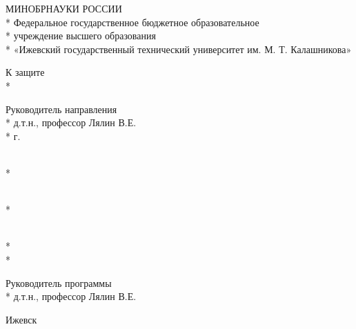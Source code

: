 \begin{titlepage}

\thispagestyle{empty}

\begin{center}
\large
МИНОБРНАУКИ РОССИИ\\*
Федеральное государственное бюджетное образовательное\\*
учреждение высшего образования\\*
«Ижевский государственный технический университет им. М. Т. Калашникова»
\vspace{1cm}
\end{center}

\hfill
\begin{minipage}{0.3\textwidth}
К защите\\*

Руководитель направления\\*
д.т.н., профессор Лялин В.Е.\\*
\text{\mydate} \text{\mymonth} \text{\myyear} г.
\end{minipage}

\vspace{6em}

\begin{center}
\textbf{\myfullname}\\*
\vspace{1em}
\titletext
\end{center}

\begin{center}
\myspeciality

\vspace{1em}

\textbf{\titletype}
\end{center}

\vspace{\fill}

\hfill
\begin{minipage}{0.3\textwidth}
\mylabel\\*
\myname

\vspace{1em}

\myteacherlabel\\*
\myteacherdegree\\*
\myteacher

\vspace{1em}

Руководитель программы\\*
д.т.н., профессор Лялин В.Е.

\vspace{1em}
\end{minipage}

\begin{center}
    Ижевск \myyear
\end{center}

\end{titlepage}

\setcounter{page}{2}
\pagestyle{plain}

